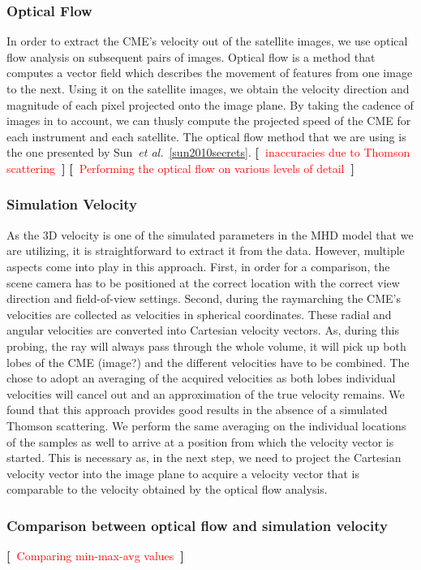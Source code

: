 \documentclass[journal]{vgtc}                %
\def\etal{\textit{et al.}}
\newcommand{\todo}[1] {\textbf{[~}\textcolor {red}{#1}\marginpar{\textcolor {red}{\centerline{{\Huge \textbf{!}}}}}\textbf{~]}}
\def\etal{\textit{et al.}}
\newcommand{\todo}[1] {\textbf{[~}\textcolor {red}{#1}\marginpar{\textcolor {red}{\centerline{{\Huge \textbf{!}}}}}\textbf{~]}}
\begin{document}
\subsubsection{Optical Flow}
In order to extract the CME's velocity out of the satellite images, we use optical flow analysis on subsequent pairs of images. Optical flow is a method that computes a vector field which describes the movement of features from one image to the next. Using it on the satellite images, we obtain the velocity direction and magnitude of each pixel projected onto the image plane. By taking the cadence of images in to account, we can thusly compute the projected speed of the CME for each instrument and each satellite. The optical flow method that we are using is the one presented by Sun~\etal~\ref{sun2010secrets}.
\todo{inaccuracies due to Thomson scattering}
\todo{Performing the optical flow on various levels of detail}

\subsubsection{Simulation Velocity}
As the 3D velocity is one of the simulated parameters in the MHD model that we are utilizing, it is straightforward to extract it from the data. However, multiple aspects come into play in this approach. First, in order for a comparison, the scene camera has to be positioned at the correct location with the correct view direction and field-of-view settings. Second, during the raymarching the CME's velocities are collected as velocities in spherical coordinates. These radial and angular velocities are converted into Cartesian velocity vectors. As, during this probing, the ray will always pass through the whole volume, it will pick up both lobes of the CME (image?) and the different velocities have to be combined. The chose to adopt an averaging of the acquired velocities as both lobes individual velocities will cancel out and an approximation of the true velocity remains. We found that this approach provides good results in the absence of a simulated Thomson scattering. We perform the same averaging on the individual locations of the samples as well to arrive at a position from which the velocity vector is started. This is necessary as, in the next step, we need to project the Cartesian velocity vector into the image plane to acquire a velocity vector that is comparable to the velocity obtained by the optical flow analysis.

\subsubsection{Comparison between optical flow and simulation velocity}
\todo{Comparing min-max-avg values}
\end{document}
